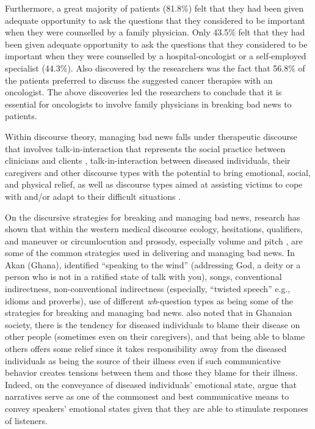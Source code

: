 \documentclass[output=paper,colorlinks,citecolor=brown]{langscibook}
\begin{document}
Furthermore, a great majority of patients (81.8\%) felt that they had been given adequate opportunity to ask the questions that they considered to be important when they were counselled by a family physician. Only 43.5\% felt that they had been given adequate opportunity to ask the questions that they considered to be important when they were counselled by a hospital‐oncologist or a self‐em\-ployed specialist (44.3\%). Also discovered by the researchers was the fact that 56.8\% of the patients preferred to discuss the suggested cancer therapies with an oncologist. The above discoveries led the researchers to conclude that it is essential for oncologists to involve family physicians in breaking bad news to patients. 

Within discourse theory, managing bad news falls under therapeutic discourse that involves talk-in-interaction that represents the social practice between clinicians and clients \citep{Leahy2004}, talk-in-interaction between diseased individuals, their caregivers and other discourse types with the potential to bring emotional, social, and physical relief, as well as discourse types aimed at assisting victims to cope with and\slash or adapt to their difficult situations \citep{Obeng2008}. 

On the discursive strategies for breaking and managing bad news, research has shown that within the western medical discourse ecology, hesitations, qualifiers, and maneuver or circumlocution \citep{Maynard2003, BrownEtAl2009} and prosody, especially volume and pitch \citep{MaynardFreese2012}, are some of the common strategies used in delivering and managing bad news. In Akan (Ghana), \citet{Obeng2008} identified “speaking to the wind” (addressing God, a deity or a person who is not in a ratified state of talk with you), songs, conventional indirectness, non-conventional indirectness (especially, “twisted speech” e.g., idioms and proverbs), use of different \textit{wh}-question types as being some of the strategies for breaking and managing bad news. \citeauthor{Obeng2008} also noted that in Ghanaian society, there is the tendency for diseased individuals to blame their disease on other people (sometimes even on their caregivers), and that being able to blame others offers some relief since it takes responsibility away from the diseased individuals as being the source of their illness even if such communicative behavior creates tensions between them and those they blame for their illness. Indeed, on the conveyance of diseased individuals’ emotional state, \citet{KalmykovaMergenthaler1998} argue that narratives serve as one of the commonest and best communicative means to convey speakers’ emotional states given that they are able to stimulate responses of listeners. 
\end{document}
